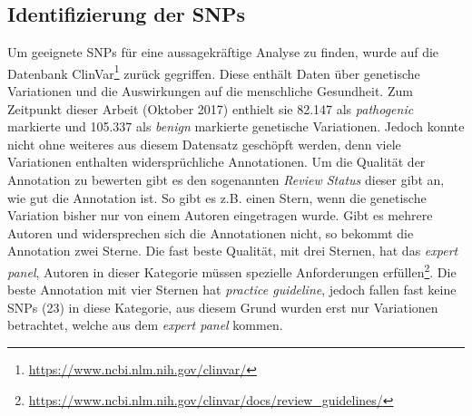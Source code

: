 \subsection{Identifizierung der SNPs}

Um geeignete \ac{SNPs} für eine aussagekräftige Analyse zu finden, wurde auf die Datenbank ClinVar\footnote{\url{https://www.ncbi.nlm.nih.gov/clinvar/}} zurück gegriffen. Diese enthält Daten über genetische Variationen und die Auswirkungen auf die menschliche Gesundheit. Zum Zeitpunkt dieser Arbeit (Oktober 2017) enthielt sie 82.147 als \emph{pathogenic} markierte und 105.337 als \emph{benign} markierte genetische Variationen. Jedoch konnte nicht ohne weiteres aus diesem Datensatz geschöpft werden, denn viele Variationen enthalten widersprüchliche Annotationen. Um die Qualität der Annotation zu bewerten gibt es den sogenannten \emph{Review Status} dieser gibt an, wie gut die Annotation ist. So gibt es z.B. einen Stern, wenn die genetische Variation bisher nur von einem Autoren eingetragen wurde. Gibt es mehrere Autoren und widersprechen sich die Annotationen nicht, so bekommt die Annotation zwei Sterne. Die fast beste Qualität, mit drei Sternen, hat das \emph{expert panel}, Autoren in dieser Kategorie müssen spezielle Anforderungen erfüllen\footnote{\url{https://www.ncbi.nlm.nih.gov/clinvar/docs/review_guidelines/}}. Die beste Annotation mit vier Sternen hat \emph{practice guideline}, jedoch fallen fast keine \ac{SNPs} (23) in diese Kategorie, aus diesem Grund wurden erst nur Variationen betrachtet, welche aus dem \emph{expert panel} kommen. 
%
